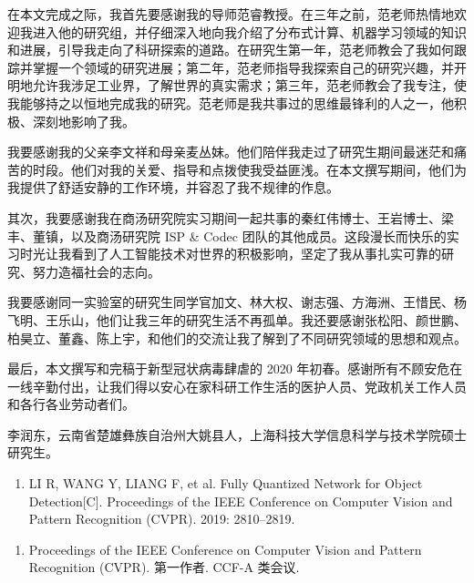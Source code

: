 \documentclass[
  fontset = mac,
]{shtthesis}
\begin{document}
\backmatter
\begin{acknowledgement}
在本文完成之际，我首先要感谢我的导师范睿教授。在三年之前，范老师热情地欢迎我进入他的研究组，并仔细深入地向我介绍了分布式计算、机器学习领域的知识和进展，引导我走向了科研探索的道路。在研究生第一年，范老师教会了我如何跟踪并掌握一个领域的研究进展；第二年，范老师指导我探索自己的研究兴趣，并开明地允许我涉足工业界，了解世界的真实需求；第三年，范老师教会了我专注，使我能够持之以恒地完成我的研究。范老师是我共事过的思维最锋利的人之一，他积极、深刻地影响了我。

我要感谢我的父亲李文祥和母亲麦丛妹。他们陪伴我走过了研究生期间最迷茫和痛苦的时段。他们对我的关爱、指导和点拨使我受益匪浅。在本文撰写期间，他们为我提供了舒适安静的工作环境，并容忍了我不规律的作息。

其次，我要感谢我在商汤研究院实习期间一起共事的秦红伟博士、王岩博士、梁丰、董镇，以及商汤研究院 ISP \& Codec 团队的其他成员。这段漫长而快乐的实习时光让我看到了人工智能技术对世界的积极影响，坚定了我从事扎实可靠的研究、努力造福社会的志向。

我要感谢同一实验室的研究生同学官加文、林大权、谢志强、方海洲、王惜民、杨飞明、王乐山，他们让我三年的研究生活不再孤单。我还要感谢张松阳、颜世鹏、柏昊立、董鑫、陈上宇，和他们的交流让我了解到了不同研究领域的思想和观点。

最后，本文撰写和完稿于新型冠状病毒肆虐的 2020 年初春。感谢所有不顾安危在一线辛勤付出，让我们得以安心在家科研工作生活的医护人员、党政机关工作人员和各行各业劳动者们。
\end{acknowledgement}

\begin{resume}
李润东，云南省楚雄彝族自治州大姚县人，上海科技大学信息科学与技术学院硕士研究生。
\end{resume}

\begin{publications}
\begin{enumerate}
  \item LI R, WANG Y, LIANG F, et al. Fully Quantized Network for Object Detection[C]. Proceedings of the IEEE Conference on Computer Vision and Pattern Recognition (CVPR). 2019: 2810--2819.
\end{enumerate}
\end{publications}

\begin{publications*}
\begin{enumerate}
  \item Proceedings of the IEEE Conference on Computer Vision and Pattern Recognition (CVPR). 第一作者. CCF-A 类会议.
\end{enumerate}
\end{publications*}
\end{document}
